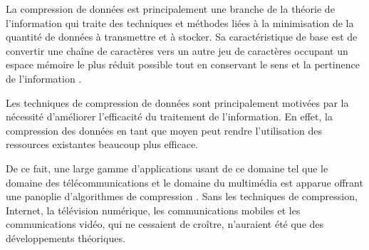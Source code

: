  La compression de données est principalement une branche de la théorie de l'information  qui traite des techniques et méthodes liées à la minimisation de la quantité de données à transmettre et à stocker.
Sa caractéristique de base est de convertir une chaîne de caractères vers un autre jeu de caractères occupant un espace mémoire le plus réduit possible tout en conservant le sens et la pertinence de l'information \citep{lelewer1987data}.

	Les techniques de compression de données sont principalement motivées par la nécessité d'améliorer l'efficacité du traitement de l'information. En effet, la compression des données en tant que moyen peut rendre l'utilisation des ressources existantes beaucoup plus efficace. 
	
	De ce fait, une large gamme d'applications usant de ce domaine tel que le domaine des télécommunications et le domaine du multimédia est apparue offrant une panoplie d'algorithmes de compression \citep{sethi2014data}. Sans les techniques de compression, Internet, la télévision numérique, les communications mobiles et les communications vidéo, qui ne cessaient de croître, n'auraient été que des développements théoriques.
	
		
		
		
